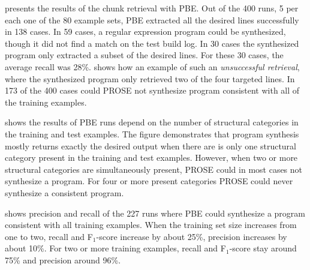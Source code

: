  presents the results of the chunk
retrieval with PBE.
Out of the 400 runs, 5 per each one of the 80 example
sets, PBE extracted all the desired lines successfully in 138 cases.
In 59 cases, a regular expression program could be synthesized, though
it did not find a match on the test build log.
In 30 cases the synthesized program only extracted a
subset of the desired lines.
For these 30 cases, the average recall
was 28\%.
 shows how an example of such
an \emph{unsuccessful retrieval}, where the synthesized program only
retrieved two of the four targeted lines.
In 173 of the 400 cases
could PROSE not synthesize program consistent with all of the training
examples.

 shows the results of PBE
runs depend on the number of structural categories in the training and
test examples.
The figure demonstrates that program synthesis mostly
returns exactly the desired output when there are is only one
structural category present in the training and test examples.
However, when
two or more structural categories are simultaneously present,
PROSE could in most cases not synthesize a program.
For four or more present
categories PROSE could never synthesize a consistent program.

 shows
precision and recall of the 227 runs where PBE could synthesize a
program consistent with all training examples.
When the training set
size increases from one to two, recall and F$_{1}$-score increase by
about 25\%, precision increases by about 10\%.
For two or more
training examples, recall and F$_{1}$-score stay around 75\% and
precision around 96\%.

